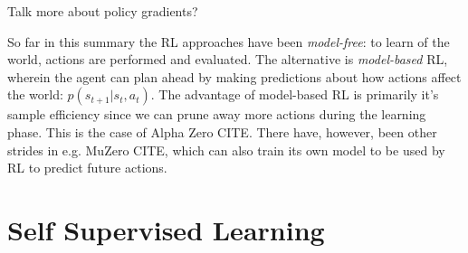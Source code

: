 \documentclass[10pt,twocolumn,letterpaper]{article}
\begin{document}
Talk more about policy gradients?

So far in this summary the \gls{RL} approaches have been \textit{model-free}: to learn of the world, actions are performed and evaluated. The alternative is \textit{model-based} \gls{RL}, wherein the agent can plan ahead by making predictions about how actions affect the world: $p(s_{t+1} \vert{} s_{t}, a_{t})$. The advantage of model-based \gls{RL} is primarily it's sample efficiency since we can prune away more actions during the learning phase. This is the case of Alpha Zero CITE. There have, however, been other strides in e.g. MuZero CITE, which can also train its own model to be used by \gls{RL} to predict future actions.







\section{Self Supervised Learning}\label{sec:ssl}

\end{document}
